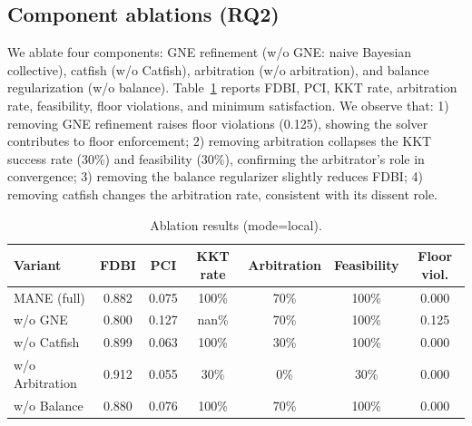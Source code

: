\documentclass[11pt]{article}
\begin{document}
\subsection{Component ablations (RQ2)}
\label{sec:rq2}
We ablate four components: GNE refinement (w/o GNE: naive Bayesian collective),
catfish (w/o Catfish), arbitration (w/o arbitration), and balance
regularization (w/o balance). Table~\ref{tab:ablation} reports FDBI, PCI,
KKT rate, arbitration rate, feasibility, floor violations, and minimum
satisfaction. We observe that: 1) removing GNE refinement raises floor
violations (0.125), showing the solver contributes to floor enforcement;
2) removing arbitration collapses the KKT success rate (30\%) and feasibility
(30\%), confirming the arbitrator's role in convergence; 3) removing the
balance regularizer slightly reduces FDBI; 4) removing catfish changes the
arbitration rate, consistent with its dissent role.
\begin{table}[t]
  \centering
  \caption{Ablation results (mode=local).}
  \label{tab:ablation}
  \begin{tabular}{lcccccc}
    \toprule
    Variant & FDBI & PCI & KKT rate & Arbitration & Feasibility & Floor viol. \\
    \midrule
    MANE (full) & 0.882 & 0.075 & 100\% & 70\% & 100\% & 0.000 \\
    w/o GNE & 0.800 & 0.127 & nan\% & 70\% & 100\% & 0.125 \\
    w/o Catfish & 0.899 & 0.063 & 100\% & 30\% & 100\% & 0.000 \\
    w/o Arbitration & 0.912 & 0.055 & 30\% & 0\% & 30\% & 0.000 \\
    w/o Balance & 0.880 & 0.076 & 100\% & 70\% & 100\% & 0.000 \\
    \bottomrule
  \end{tabular}
\end{table}
\end{document}
